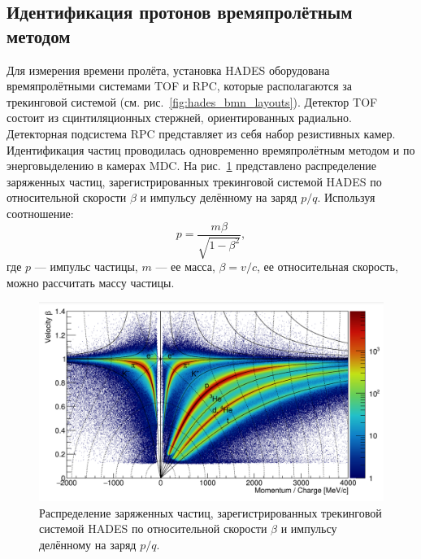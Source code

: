 \subsection{Идентификация протонов времяпролётным методом}

Для измерения времени пролёта, установка HADES оборудована времяпролётными системами TOF и RPC, которые располагаются за трекинговой системой (см. рис.~\ref{fig:hades_bmn_layouts}).
Детектор TOF состоит из сцинтиляционных стержней, ориентированных радиально.
Детекторная подсистема RPC представляет из себя набор резистивных камер.
Идентификация частиц проводилась одновременно времяпролётным методом и по энерговыделению в камерах MDC.
На рис.~\ref{fig:hades_pid} представлено распределение заряженных частиц, зарегистрированных трекинговой системой HADES по относительной скорости $\beta$ и импульсу делённому на заряд $p/q$.
Используя соотношение:
\begin{equation}
    p = \frac{ m\beta }{ \sqrt{1-\beta^2} },
\end{equation}
где $p$ --- импульс частицы, $m$ --- ее масса, $\beta=v/c$, ее относительная скорость, можно рассчитать массу частицы.
%
\begin{figure}[ht]
    \begin{center}
    \includegraphics[width=0.95\linewidth]{images/hades_pid_plot.png}
    \caption{Распределение заряженных частиц, зарегистрированных трекинговой системой HADES по относительной скорости $\beta$ и импульсу делённому на заряд $p/q$.}
    \label{fig:hades_pid}
    \end{center}
    \end{figure}
    

